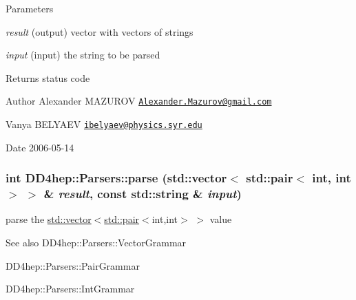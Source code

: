 \begin{DoxyParams}{Parameters}
\item[{\em result}](output) vector with vectors of strings \item[{\em input}](input) the string to be parsed \end{DoxyParams}
\begin{DoxyReturn}{Returns}
status code
\end{DoxyReturn}
\begin{DoxyAuthor}{Author}
Alexander MAZUROV \href{mailto:Alexander.Mazurov@gmail.com}{\tt Alexander.Mazurov@gmail.com} 

Vanya BELYAEV \href{mailto:ibelyaev@physics.syr.edu}{\tt ibelyaev@physics.syr.edu} 
\end{DoxyAuthor}
\begin{DoxyDate}{Date}
2006-\/05-\/14 
\end{DoxyDate}
\hypertarget{namespace_d_d4hep_1_1_parsers_a300ef2062786116541bef473b809ee22}{
\subsubsection[{parse}]{\setlength{\rightskip}{0pt plus 5cm}int DD4hep::Parsers::parse (std::vector$<$ std::pair$<$ int, int $>$ $>$ \& {\em result}, \/  const std::string \& {\em input})}}
\label{namespace_d_d4hep_1_1_parsers_a300ef2062786116541bef473b809ee22}


parse the {\ttfamily \hyperlink{classstd_1_1vector}{std::vector}$<$\hyperlink{classstd_1_1pair}{std::pair}$<$int,int$>$ $>$} value \begin{DoxySeeAlso}{See also}
DD4hep::Parsers::VectorGrammar 

DD4hep::Parsers::PairGrammar 

DD4hep::Parsers::IntGrammar 
\end{DoxySeeAlso}

